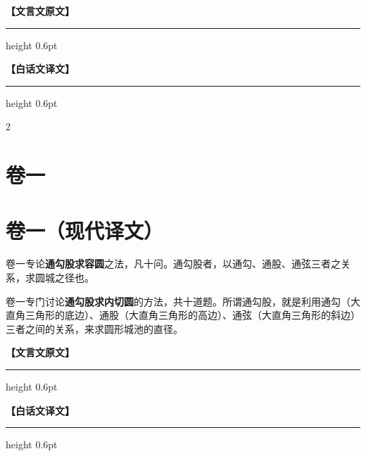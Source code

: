 \documentclass[11pt,a4paper]{article}
\newcommand{\colheaders}{%
  \noindent\begin{minipage}[t]{0.48\textwidth}\centering
    \textbf{\color{classicalframe}【文言文原文】}
    \vspace{0.3em}
    \hrule height 0.6pt
  \end{minipage}%
  \hfill
  \begin{minipage}[t]{0.48\textwidth}\centering
    \textbf{\color{modernframe}【白话文译文】}
    \vspace{0.3em}
    \hrule height 0.6pt
  \end{minipage}
  \par\medskip
}
\begin{document}
\clearpage
\colheaders
\begin{paracol}{2}

\section{卷一}

\switchcolumn
\section*{卷一（现代译文）}

\switchcolumn*

卷一专论\textbf{通勾股求容圆}之法，凡十问。通勾股者，以通勾、通股、通弦三者之关系，求圆城之径也。

\switchcolumn

卷一专门讨论\textbf{通勾股求内切圆}的方法，共十道题。所谓通勾股，就是利用通勾（大直角三角形的底边）、通股（大直角三角形的高边）、通弦（大直角三角形的斜边）三者之间的关系，来求圆形城池的直径。

\switchcolumn*

\end{paracol}
\clearpage
\colheaders
\end{document}
